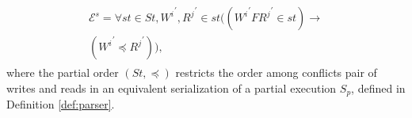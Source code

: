 \documentclass{sig-alternate-05-2015}
\begin{document}
\begin{align}
  \begin{split}
 \mathcal{E}^{s} = \forall  \mathit{st} \in \mathit{St}, {W^i}^{'}, {R^j}^{'} \in \mathit{st}
  \big( \left( {W^i}^{'} F {R^j}^{'} \in \mathit{st} \right)
 \rightarrow \\
 \left(  {W^i}^{'} \preccurlyeq {R^j}^{'} \right)\big),
  \end{split}
  \end{align}\label{eqn:RYW} where the partial order $\left( \mathit{St}, \preccurlyeq \right)$ restricts the   order among conflicts pair of writes and reads in an equivalent serialization of a partial execution $S_p$, defined in Definition \ref{def:parser}.
\end{document}
